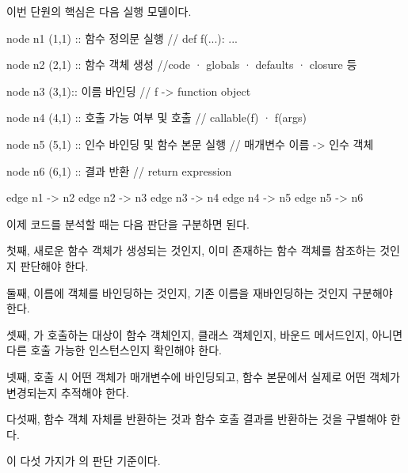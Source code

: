 이번 단원의 핵심은 다음 실행 모델이다.

\begin{dhkgraph}[uniform]
node n1 (1,1) :: 함수 정의문 실행 // def f(...): ...

node n2 (2,1) :: 함수 객체 생성 //code · globals · defaults · closure 등

node n3 (3,1):: 이름 바인딩 // f -> function object

node n4 (4,1) :: 호출 가능 여부 및 호출 // callable(f) · f(args)

node n5 (5,1) :: 인수 바인딩 및 함수 본문 실행 // 매개변수 이름 -> 인수 객체

node n6 (6,1) :: 결과 반환 // return expression

edge n1 -> n2
edge n2 -> n3
edge n3 -> n4
edge n4 -> n5
edge n5 -> n6
\end{dhkgraph}

이제 코드를 분석할 때는 다음 판단을 구분하면 된다.

첫째, 새로운 함수 객체가 생성되는 것인지, 이미 존재하는 함수 객체를 참조하는 것인지 판단해야 한다.

둘째, 이름에 객체를 바인딩하는 것인지, 기존 이름을 재바인딩하는 것인지 구분해야 한다.

셋째, \zsh{()}가 호출하는 대상이 함수 객체인지, 클래스 객체인지, 바운드 메서드인지, 아니면 다른 호출 가능한 인스턴스인지 확인해야 한다.

넷째, 호출 시 어떤 객체가 매개변수에 바인딩되고, 함수 본문에서 실제로 어떤 객체가 변경되는지 추적해야 한다.

다섯째, 함수 객체 자체를 반환하는 것과 함수 호출 결과를 반환하는 것을 구별해야 한다.

이 다섯 가지가 의 판단 기준이다.
